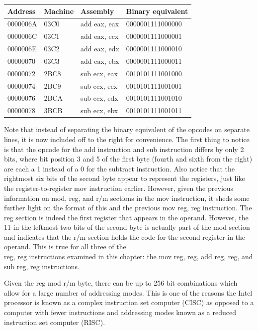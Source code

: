 \documentclass[10pt]{book}
\begin{document}
\begin{center}
\begin{tabular}{|l|l|l|l|}
\hline
Address & Machine & Assembly & Binary equivalent \\
\hline
0000006A & 03C0 & add eax, eax & 0000001111000000 \\
\hline
0000006C & 03C1 & add eax, ecx & 0000001111000001 \\
\hline
0000006E & 03C2 & add eax, edx & 0000001111000010 \\
\hline
00000070 & 03C3 & add eax, ebx & 0000001111000011 \\
\hline
00000072 & 2BC8 & sub ecx, eax & 0010101111001000 \\
\hline
00000074 & 2BC9 & sub ecx, ecx & 0010101111001001 \\
\hline
00000076 & 2BCA & sub ecx, edx & 0010101111001010 \\
\hline
00000078 & 3BCB & sub ecx, ebx & 0010101111001011 \\
\hline
\end{tabular}
\end{center}

Note that instead of separating the binary equivalent of the opcodes on separate lines, it is now included off to the right for convenience. The first thing to notice is that the opcode for the add instruction and sub instruction differs by only 2 bits, where bit position 3 and 5 of the first byte (fourth and sixth from the right) are each a 1 instead of a 0 for the subtract instruction. Also notice that the rightmost six bits of the second byte appear to represent the registers, just like the register-to-register mov instruction earlier. However, given the previous information on mod, reg, and $\mathrm{r} / \mathrm{m}$ sections in the mov instruction, it sheds some further light on the format of this and the previous mov reg, reg instruction. The reg section is indeed the first register that appears in the operand. However, the 11 in the leftmost two bits of the second byte is actually part of the mod section and indicates that the r/m section holds the code for the second register in the operand. This is true for all three of the\\
reg, reg instructions examined in this chapter: the mov reg, reg, add reg, reg, and sub reg, reg instructions.


Given the reg mod r/m byte, there can be up to 256 bit combinations which allow for a large number of addressing modes. This is one of the reasons the Intel processor is known as a complex instruction set computer (CISC) as opposed to a computer with fewer instructions and addressing modes known as a reduced instruction set computer (RISC).
\end{document}
